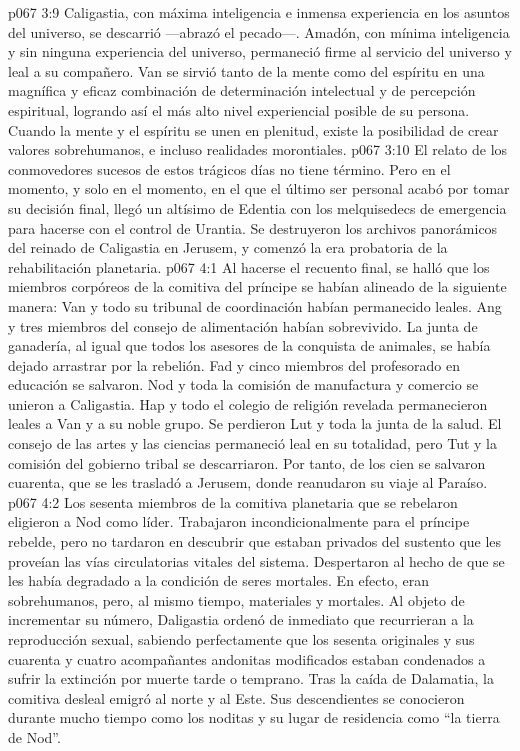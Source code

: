 \vs p067 3:9 Caligastia, con máxima inteligencia e inmensa experiencia en los asuntos del universo, se descarrió ---abrazó el pecado---. Amadón, con mínima inteligencia y sin ninguna experiencia del universo, permaneció firme al servicio del universo y leal a su compañero. Van se sirvió tanto de la mente como del espíritu en una magnífica y eficaz combinación de determinación intelectual y de percepción espiritual, logrando así el más alto nivel experiencial posible de su persona. Cuando la mente y el espíritu se unen en plenitud, existe la posibilidad de crear valores sobrehumanos, e incluso realidades morontiales.
\vs p067 3:10 El relato de los conmovedores sucesos de estos trágicos días no tiene término. Pero en el momento, y solo en el momento, en el que el último ser personal acabó por tomar su decisión final, llegó un altísimo de Edentia con los melquisedecs de emergencia para hacerse con el control de Urantia. Se destruyeron los archivos panorámicos del reinado de Caligastia en Jerusem, y comenzó la era probatoria de la rehabilitación planetaria.
\vs p067 4:1 Al hacerse el recuento final, se halló que los miembros corpóreos de la comitiva del príncipe se habían alineado de la siguiente manera: Van y todo su tribunal de coordinación habían permanecido leales. Ang y tres miembros del consejo de alimentación habían sobrevivido. La junta de ganadería, al igual que todos los asesores de la conquista de animales, se había dejado arrastrar por la rebelión. Fad y cinco miembros del profesorado en educación se salvaron. Nod y toda la comisión de manufactura y comercio se unieron a Caligastia. Hap y todo el colegio de religión revelada permanecieron leales a Van y a su noble grupo. Se perdieron Lut y toda la junta de la salud. El consejo de las artes y las ciencias permaneció leal en su totalidad, pero Tut y la comisión del gobierno tribal se descarriaron. Por tanto, de los cien se salvaron cuarenta, que se les trasladó a Jerusem, donde reanudaron su viaje al Paraíso.
\vs p067 4:2 Los sesenta miembros de la comitiva planetaria que se rebelaron eligieron a Nod como líder. Trabajaron incondicionalmente para el príncipe rebelde, pero no tardaron en descubrir que estaban privados del sustento que les proveían las vías circulatorias vitales del sistema. Despertaron al hecho de que se les había degradado a la condición de seres mortales. En efecto, eran sobrehumanos, pero, al mismo tiempo, materiales y mortales. Al objeto de incrementar su número, Daligastia ordenó de inmediato que recurrieran a la reproducción sexual, sabiendo perfectamente que los sesenta originales y sus cuarenta y cuatro acompañantes andonitas modificados estaban condenados a sufrir la extinción por muerte tarde o temprano. Tras la caída de Dalamatia, la comitiva desleal emigró al norte y al Este. Sus descendientes se conocieron durante mucho tiempo como los noditas y su lugar de residencia como “la tierra de Nod”.
